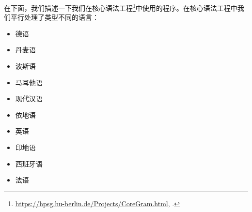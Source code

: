 在下面，我们描述一下我们在核心语法工程\footnote{%
\url{https://hpsg.hu-berlin.de/Projects/CoreGram.html}, \mytodayc.
}\citep{MuellerCoreGramBrief,MuellerCoreGram}中使用的程序。在核心语法工程中我们平行处理了类型不同的语言：
\begin{itemize}
\item 德语  \citep{MuellerLehrbuch1,MuellerPredication,MuellerCopula,MOe2011a,MOe2013a,MuellerArten,MuellerGS}\vspace{-\baselineskip}
\item 丹麦语  \citep{Oersnes2009a,MuellerPredication,MuellerCopula,MOe2011a,MOe2013a,MOe2013b,MOeDanish}\vspace{-\baselineskip}
\item 波斯语 \citep*{MuellerPersian,MG2010a}
\item 马耳他语 \citep{MuellerMalteseSketch}
\item 现代汉语 \citep{Lipenkova2009a,ML2009a,ML2013a,MLChinese}
\item 依地语 \citep{MOe2011a}
\item 英语 \citep{MuellerPredication,MuellerCopula,MOe2013a}
\item 印地语
\item 西班牙语 \citep{Machicao-y-Priemer2015a}
\item 法语
\end{itemize}


